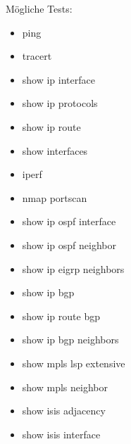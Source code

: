 \documentclass[
	ngerman,
	toc=listof, %
	toc=bibliography, %
	footnotes=multiple, %
	parskip=half, %
	numbers=noendperiod %
]{scrartcl}
\begin{document}
	Mögliche Tests:
	\begin{itemize}
		\item ping
		\item tracert
		\item show ip interface 
		\item show ip protocols
		\item show ip route
		\item show interfaces
		\item iperf
		\item nmap portscan
		\item show ip ospf interface
		\item show ip ospf neighbor
		\item show ip eigrp neighbors
		\item show ip bgp 
		\item show ip route bgp 
		\item show ip bgp neighbors
		\item show mpls lsp extensive
		\item show mpls neighbor
		\item show isis adjacency
		\item show isis interface
	\end{itemize}
\end{document}
